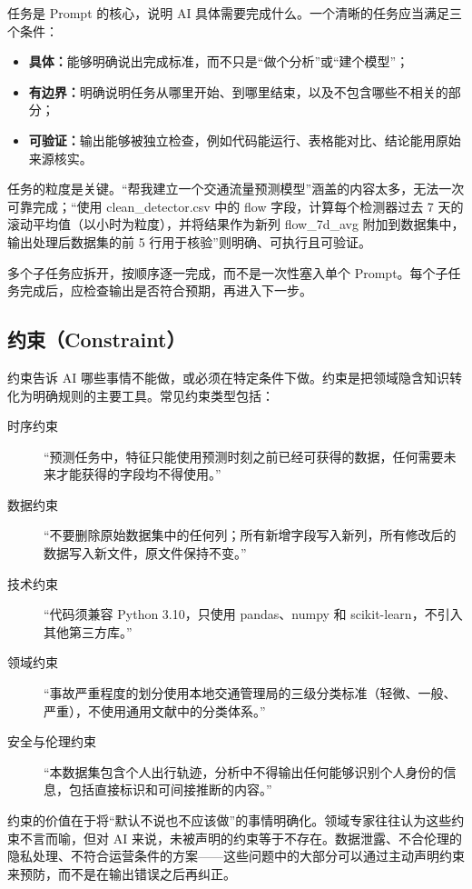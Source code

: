 任务是 Prompt 的核心，说明 AI 具体需要完成什么。一个清晰的任务应当满足三个条件：

\begin{itemize}
  \item \textbf{具体：}能够明确说出完成标准，而不只是“做个分析”或“建个模型”；
  \item \textbf{有边界：}明确说明任务从哪里开始、到哪里结束，以及不包含哪些不相关的部分；
  \item \textbf{可验证：}输出能够被独立检查，例如代码能运行、表格能对比、结论能用原始来源核实。
\end{itemize}

任务的粒度是关键。“帮我建立一个交通流量预测模型”涵盖的内容太多，无法一次可靠完成；“使用 clean\_detector.csv 中的 flow 字段，计算每个检测器过去 7 天的滚动平均值（以小时为粒度），并将结果作为新列 flow\_7d\_avg 附加到数据集中，输出处理后数据集的前 5 行用于核验”则明确、可执行且可验证。

多个子任务应拆开，按顺序逐一完成，而不是一次性塞入单个 Prompt。每个子任务完成后，应检查输出是否符合预期，再进入下一步。

\subsection{约束（Constraint）}

约束告诉 AI 哪些事情不能做，或必须在特定条件下做。约束是把领域隐含知识转化为明确规则的主要工具。常见约束类型包括：

\begin{description}
  \item[时序约束]“预测任务中，特征只能使用预测时刻之前已经可获得的数据，任何需要未来才能获得的字段均不得使用。”
  \item[数据约束]“不要删除原始数据集中的任何列；所有新增字段写入新列，所有修改后的数据写入新文件，原文件保持不变。”
  \item[技术约束]“代码须兼容 Python 3.10，只使用 pandas、numpy 和 scikit-learn，不引入其他第三方库。”
  \item[领域约束]“事故严重程度的划分使用本地交通管理局的三级分类标准（轻微、一般、严重），不使用通用文献中的分类体系。”
  \item[安全与伦理约束]“本数据集包含个人出行轨迹，分析中不得输出任何能够识别个人身份的信息，包括直接标识和可间接推断的内容。”
\end{description}

约束的价值在于将“默认不说也不应该做”的事情明确化。领域专家往往认为这些约束不言而喻，但对 AI 来说，未被声明的约束等于不存在。数据泄露、不合伦理的隐私处理、不符合运营条件的方案——这些问题中的大部分可以通过主动声明约束来预防，而不是在输出错误之后再纠正。

